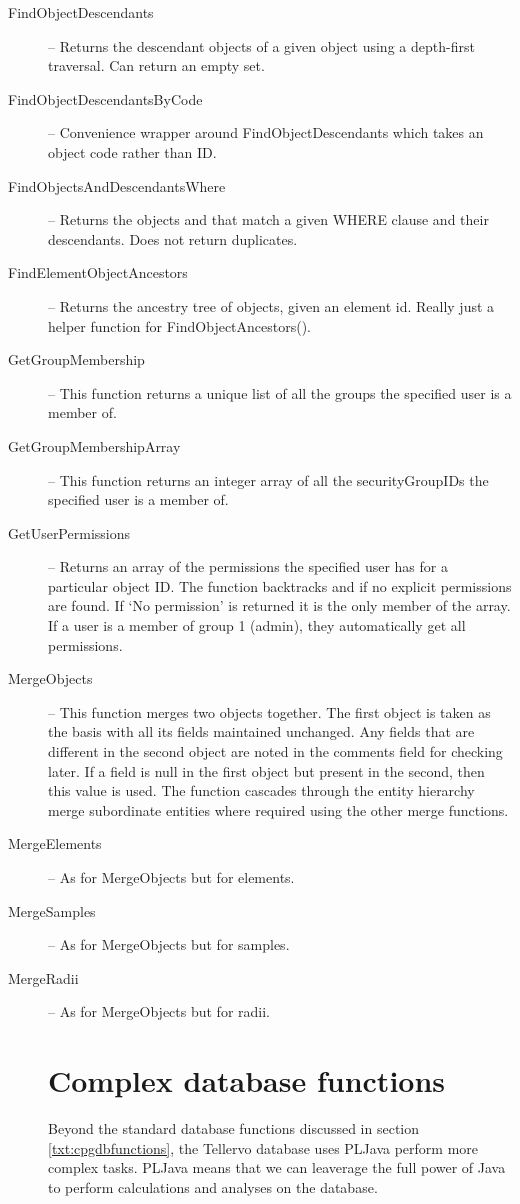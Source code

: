 \begin{description}
 \item[FindObjectDescendants] -- Returns the descendant objects of a given object using a depth-first traversal. Can return an empty set. 

 \item[FindObjectDescendantsByCode] -- Convenience wrapper around FindObjectDescendants which takes an object code rather than ID.

 \item[FindObjectsAndDescendantsWhere] -- Returns the objects and that match a given WHERE clause and their descendants. Does not return duplicates. 

 \item[FindElementObjectAncestors] -- Returns the ancestry tree of objects, given an element id. Really just a helper function for FindObjectAncestors(). 

 \item[GetGroupMembership] -- This function returns a unique list of all the groups the specified user is a member of. 

 \item[GetGroupMembershipArray] -- This function returns an integer array of all the securityGroupIDs the specified user is a member of. 

 \item[GetUserPermissions] -- Returns an array of the permissions the specified user has for a particular object ID. The function backtracks  and  if no explicit permissions are found. If `No permission' is returned it is the only member of the array. If a user is a member of group 1 (admin), they automatically get all permissions. 

 \item[MergeObjects] -- This function merges two objects together. The first object is taken as the basis with all its fields maintained unchanged. Any fields that are different in the second object are noted in the comments field for checking later. If a field is null in the first object but present in the second, then this value is used. The function cascades through the entity hierarchy merge subordinate entities where required using the other merge functions. 

 \item[MergeElements] -- As for MergeObjects but for elements.

 \item[MergeSamples] -- As for MergeObjects but for samples.

 \item[MergeRadii] -- As for MergeObjects but for radii.



\section{Complex database functions}
Beyond the standard database functions discussed in section \ref{txt:cpgdbfunctions}, the Tellervo database uses PLJava perform more complex tasks.  PLJava means that we can leaverage the full power of Java to perform calculations and analyses on the database.  

\end{description}